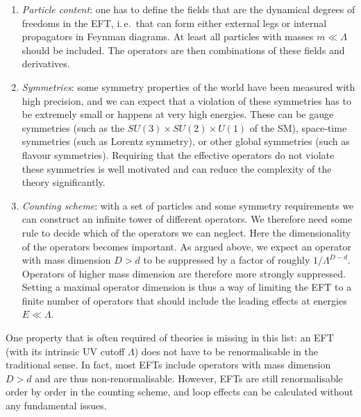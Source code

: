 \begin{enumerate}
\item \emph{Particle content}: one has to define the fields that are
  the dynamical degrees of freedoms in the EFT, i.\,e.\ that can form
  either external legs or internal propagators in Feynman diagrams. At
  least all particles with masses $m \ll \Lambda$ should be
  included. The operators are then combinations of these fields and
  derivatives.
%
\item \emph{Symmetries}: some symmetry properties of the world have
  been measured with high precision, and we can expect that a
  violation of these symmetries has to be extremely small or happens
  at very high energies. These can be gauge symmetries (such as the
  $SU(3) \times SU(2) \times U(1)$ of the SM), space-time symmetries
  (such as Lorentz symmetry), or other global symmetries (such as
  flavour symmetries). Requiring that the effective operators do not
  violate these symmetries is well motivated and can reduce the
  complexity of the theory significantly.
%
\item \emph{Counting scheme}: with a set of particles and some
  symmetry requirements we can construct an infinite tower of
  different operators. We therefore need some rule to decide which of
  the operators we can neglect. Here the dimensionality of the
  operators becomes important. As argued above, we expect an operator
  with mass dimension $D > d$ to be suppressed by a factor of roughly
  $1 / \Lambda^{D-d}$. Operators of higher mass dimension are
  therefore more strongly suppressed. Setting a maximal operator
  dimension is thus a way of limiting the EFT to a finite number of
  operators that should include the leading effects at energies
  $E \ll \Lambda$.
\end{enumerate}

One property that is often required of theories is missing in this
list: an EFT (with its intrinsic UV cutoff $\Lambda$) does not have to
be renormalisable in the traditional sense. In fact, most EFTs include
operators with mass dimension $D > d$ and are thus non-renormalisable.
However, EFTs are still renormalisable order by order in the counting
scheme, and loop effects can be calculated without any fundamental
issues.





